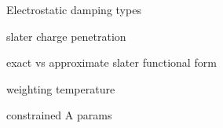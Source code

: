 Electrostatic damping types

slater charge penetration

exact vs approximate slater functional form

weighting temperature

constrained A params
